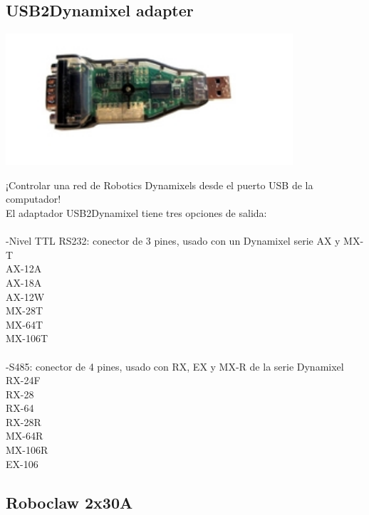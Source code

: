 \documentclass[a4paper]{book}
\begin{document}
\subsection{USB2Dynamixel adapter}

\begin{center}
\includegraphics[width=0.8\textwidth]{Figures/Hardware/Partes/Dynamixel.png}
\label{fig:Hardware:Partes:Dynamixel}
\end{center}

¡Controlar una red de Robotics Dynamixels desde el puerto USB de la computador!\\
El adaptador USB2Dynamixel tiene tres opciones de salida:\\
\\
-Nivel TTL RS232: conector de 3 pines, usado con un Dynamixel serie AX y MX-T\\

AX-12A\\
AX-18A\\
AX-12W\\
MX-28T\\
MX-64T\\
MX-106T\\
\\

-S485: conector de 4 pines, usado con RX, EX y MX-R de la serie Dynamixel\\

RX-24F\\
RX-28\\
RX-64\\
RX-28R\\
MX-64R\\
MX-106R\\
EX-106\\


\subsection{Roboclaw 2x30A}
\end{document}
